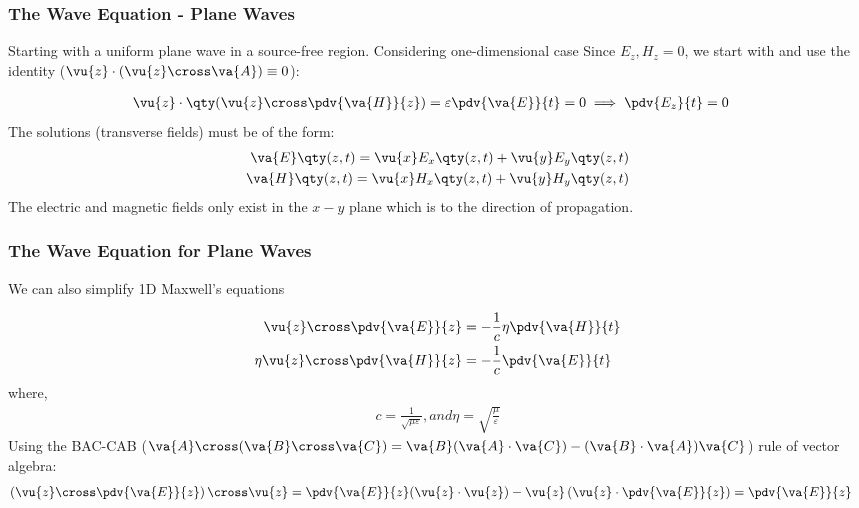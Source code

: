 \documentclass[10pt, compress]{beamer}
\newcommand{\E}{\varepsilon}  %
\renewcommand{\u}{\mu}  %
\begin{document}
\begin{frame}
  \frametitle{The Wave Equation - Plane Waves}
  \begin{outline}
    \1 Starting with a uniform plane wave in a source-free region.
    \1 Considering one-dimensional case
    \1 Since $E_z, H_z = 0$, we start with and use the identity ($\vu{z} \cdot (\vu{z} \cross \va{A}) \equiv 0$):
  \end{outline}
      \begin{align*}
        \vu{z} \cdot \qty( \vu{z} \cross \pdv{\va{H}}{z}) &= \E \pdv{\va{E}}{t} = 0 \implies \pdv{E_z}{t} = 0
      \end{align*}
      The solutions (transverse fields) must be of the form:
      \begin{align*}
        \va{E} \qty(z, t) = \vu{x} E_x \qty(z,t) + \vu{y} E_y\qty(z,t) \\
        \va{H} \qty(z, t) = \vu{x} H_x \qty(z,t) + \vu{y} H_y \qty(z,t)
      \end{align*}
      The electric and magnetic fields only exist in the $x-y$ plane which is \color{red}{perpendicular} to the direction of propagation.
 \end{frame}
\begin{frame}
  \frametitle{The Wave Equation for Plane Waves}
  \begin{outline}
    \1 We can also simplify 1D Maxwell's equations
  \end{outline}
  \begin{align*}
    \vu{z} \cross \pdv{\va{E}}{z} &= -\frac{1}{c} \eta \pdv{\va{H}}{t} \\
        \eta \vu{z} \cross \pdv{\va{H}}{z} &= -\frac{1}{c} \pdv{\va{E}}{t}
  \end{align*}
  where,
  \begin{align*}
    c = \frac{1}{\sqrt{\u \E}}, and \eta = \sqrt{\frac{\u}{\E}}
  \end{align*}
  Using the BAC-CAB ($\va{A} \cross(\va{B} \cross \va{C})=\va{B}(\va{A} \cdot \va{C})-(\va{B} \cdot \va{A}) \va{C}$) rule of vector algebra:
  \begin{align*}
    \left( \vu{z} \cross \pdv{\va{E}}{z} \right) \cross \vu{z} &= \pdv{\va{E}}{z} (\vu{z} \cdot \vu{z}) - \vu{z} \left (\vu{z} \cdot \pdv{\va{E}}{z} \right) = \pdv{\va{E}}{z}
  \end{align*}
\end{frame}
\end{document}
